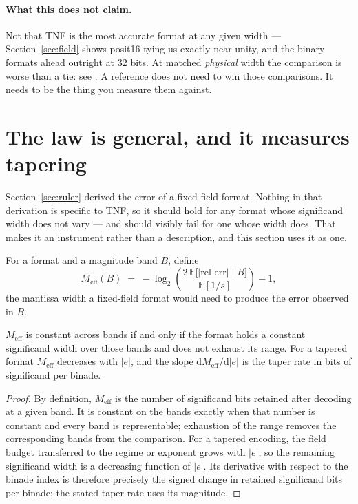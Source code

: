 \paragraph{What this does not claim.} Not that TNF is the most accurate format
at any given width --- Section~\ref{sec:field} shows posit16 tying us exactly
near unity, and the binary formats ahead outright at 32 bits. At matched
\emph{physical} width the comparison is worse than a tie: see
. A reference does not need to win those comparisons. It needs to be the
thing you measure them against.



\section{The law is general, and it measures tapering}\label{sec:law}

Section~\ref{sec:ruler} derived the error of a fixed-field format. Nothing in that
derivation is specific to TNF, so it should hold for any format whose significand
width does not vary --- and should visibly fail for one whose width does. That
makes it an instrument rather than a description, and this section uses it as one.

\begin{definition}
For a format and a magnitude band $B$, define
\[
  M_{\mathrm{eff}}(B) \;=\; -\log_2\!\left(\frac{2\,\mathbb{E}\bigl[|\text{rel err}|\;\big|\;B\bigr]}{\mathbb{E}[1/s]}\right) - 1 ,
\]
the mantissa width a fixed-field format would need to produce the error observed
in $B$.
\end{definition}

\begin{theorem}[Diagnostic]\label{thm:diag}
$M_{\mathrm{eff}}$ is constant across bands if and only if the format holds a
constant significand width over those bands and does not exhaust its range. For a
tapered format $M_{\mathrm{eff}}$ decreases with $|e|$, and the slope
$\mathrm{d}M_{\mathrm{eff}}/\mathrm{d}|e|$ is the taper rate in bits of
significand per binade.
\end{theorem}
\begin{proof}
By definition, $M_{\mathrm{eff}}$ is the number of significand bits retained
after decoding at a given band. It is constant on the bands exactly when that
number is constant and every band is representable; exhaustion of the range
removes the corresponding bands from the comparison. For a tapered encoding,
the field budget transferred to the regime or exponent grows with $|e|$, so the
remaining significand width is a decreasing function of $|e|$. Its derivative
with respect to the binade index is therefore precisely the signed change in
retained significand bits per binade; the stated taper rate uses its magnitude.
\end{proof}

